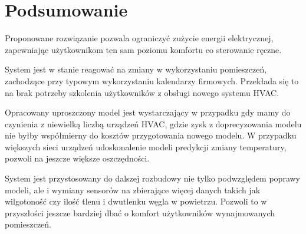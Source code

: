 \section{Podsumowanie}
Proponowane rozwiązanie pozwala ograniczyć zużycie energii elektrycznej, zapewniając użytkownikom ten sam poziomu komfortu co sterowanie ręczne. 

System jest w stanie reagować na zmiany w wykorzystaniu pomieszczeń, zachodzące przy typowym wykorzystaniu kalendarzy firmowych. Przekłada się to na brak potrzeby szkolenia użytkowników z obsługi nowego systemu HVAC. 

Opracowany uproszczony model jest wystarczający w przypadku gdy mamy do czynienia z niewielką liczbą urządzeń HVAC, gdzie zysk z doprecyzowania modelu nie byłby współmierny do kosztów przygotowania nowego modelu. W przypadku większych sieci urządzeń udoskonalenie modeli predykcji zmiany temperatury, pozwoli na jeszcze większe oszczędności. 

System jest przystosowany do dalszej rozbudowy nie tylko podwzględem poprawy modeli, ale i wymiany sensorów na zbierające więcej danych takich jak wilgotoność czy ilość tlenu i dwutlenku węgla w powietrzu.
Pozwoli to w przyszłości jeszcze bardziej dbać o komfort użytkowników wynajmowanych pomieszczeń.
